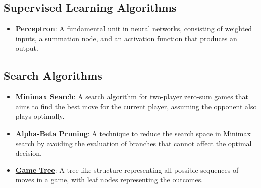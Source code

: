 \documentclass{article}%
\begin{document}
%
\subsection{Supervised Learning Algorithms}%
\label{subsec:SupervisedLearningAlgorithms}%
\begin{itemize}[leftmargin=*]%
\item \href{https://purdue.brightspace.com/d2l/common/assets/pdfjs-d2l-dist/1.0.14-legacy/web/viewer.html?file=\%2Fcontent\%2Fenforced\%2F1095467-wl.202510.CS.24300.001\%2F02L2-Intro.pdf\%3Fou\%3D1095467\&lang=en-us\&container=d2l-fileviewer-rendered-pdf\&fullscreen=d2l-fileviewer-rendered-pdf-dialog\&height=667#page=45}{\textbf{Perceptron}}: A fundamental unit in neural networks, consisting of weighted inputs, a summation node, and an activation function that produces an output.%
\end{itemize}

%
\subsection{Search Algorithms}%
\label{subsec:SearchAlgorithms}%
\begin{itemize}[leftmargin=*]%
\item \href{https://purdue.brightspace.com/d2l/common/assets/pdfjs-d2l-dist/1.0.14-legacy/web/viewer.html?file=\%2Fcontent\%2Fenforced\%2F1095467-wl.202510.CS.24300.001\%2F02L2-Intro.pdf\%3Fou\%3D1095467\&lang=en-us\&container=d2l-fileviewer-rendered-pdf\&fullscreen=d2l-fileviewer-rendered-pdf-dialog\&height=667#page=22}{\textbf{Minimax Search}}: A search algorithm for two{-}player zero{-}sum games that aims to find the best move for the current player, assuming the opponent also plays optimally.%
\item \href{https://purdue.brightspace.com/d2l/common/assets/pdfjs-d2l-dist/1.0.14-legacy/web/viewer.html?file=\%2Fcontent\%2Fenforced\%2F1095467-wl.202510.CS.24300.001\%2F02L2-Intro.pdf\%3Fou\%3D1095467\&lang=en-us\&container=d2l-fileviewer-rendered-pdf\&fullscreen=d2l-fileviewer-rendered-pdf-dialog\&height=667#page=23}{\textbf{Alpha{-}Beta Pruning}}: A technique to reduce the search space in Minimax search by avoiding the evaluation of branches that cannot affect the optimal decision.%
\item \href{https://purdue.brightspace.com/d2l/common/assets/pdfjs-d2l-dist/1.0.14-legacy/web/viewer.html?file=\%2Fcontent\%2Fenforced\%2F1095467-wl.202510.CS.24300.001\%2F02L2-Intro.pdf\%3Fou\%3D1095467\&lang=en-us\&container=d2l-fileviewer-rendered-pdf\&fullscreen=d2l-fileviewer-rendered-pdf-dialog\&height=667#page=11}{\textbf{Game Tree}}: A tree{-}like structure representing all possible sequences of moves in a game, with leaf nodes representing the outcomes.%
\end{itemize}
\end{document}
